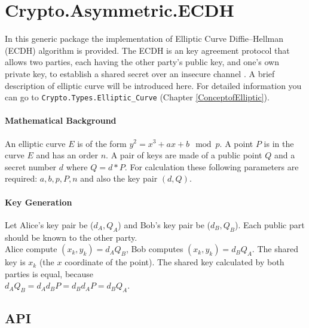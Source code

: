 \chapter{Crypto.Asymmetric.ECDH}\label{ECDH}
In this generic package the implementation of Elliptic Curve
Diffie–Hellman (ECDH) algorithm is provided. The ECDH is an key
agreement protocol that allows two parties, each having the other
party's public key, and one's own private key, to establish a shared
secret over an insecure channel \cite{ECDH-NIST}. A brief description
of elliptic curve will be introduced here. For detailed information
you can go to \texttt{Crypto.Types.Elliptic\_Curve} (Chapter
\ref{ConceptofElliptic}).

\subsubsection*{Mathematical Background}
An elliptic curve $E$ is of the form $y^2=x^3+ax+b\mod p$. A point $P$
is in the curve $E$ and has an order $n$. A pair of keys are made of a
public point $Q$ and a secret number $d$ where $Q=d*P$. For
calculation these following parameters are required: $a,b,p,P,n$ and
also the key pair $(d,Q)$.

\subsubsection*{Key Generation}
Let Alice's key pair be ($d_A,Q_A$) and Bob's key pair be
($d_B,Q_B$). Each public part should be known to the other
party.\\ Alice compute $(x_k,y_k)=d_AQ_B$, Bob computes
$(x_k,y_k)=d_BQ_A$. The shared key is $x_k$ (the $x$ coordinate of the
point). The shared key calculated by both parties is equal,
because\\ $d_AQ_B=d_Ad_BP=d_Bd_AP=d_BQ_A$.
\section{API}
